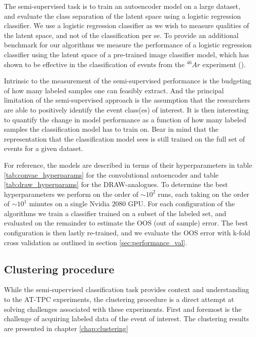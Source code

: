 The semi-supervised task is to train an autoencoder model on a large dataset, and evaluate the class separation of the latent space using a logistic regression classifier. We use a logistic regression classifier as we wish to measure qualities of the latent space, and not of the classification per se. To provide an additional benchmark for our algorithms we measure the performance of a logistic regression classifier using the latent space of a pre-trained image classifier model, which has shown to be effective in the classification of events from the ${}^{46}Ar$ experiment (\cite{Kuchera2019}).

Intrinsic to the measurement of the semi-supervised performance is the budgeting of how many labeled samples one can feasibly extract. And the principal limitation of the semi-supervised approach is the assumption that the researchers are able to positively identify the event class(es) of interest. It is then interesting to quantify the change in model performance as a function of how many labeled samples the classification model has to train on. Bear in mind that the representation that the classification model sees is still trained on the full set of events for a given dataset. 

For reference, the models are described in terms of their hyperparameters in table \ref{tab:convae_hyperparams} for the convolutional autoencoder and table \ref{tab:draw_hyperparams} for the DRAW-analogues. To determine the best hyperparameters we perform on the order of $\sim 10^2$ runs, each taking on the order of $\sim 10^1$ minutes on a single Nvidia $2080$ GPU. For each configuration of the algorithms we train a classifier trained on a subset of the labeled set, and evaluated on the remainder to estimate the OOS (out of sample) error. The best configuration is then lastly re-trained, and we evaluate the OOS error with k-fold cross validation as outlined in section \ref{sec:performance_val}.

\subsection{Clustering procedure}

While the semi-supervised classification task provides context and understanding to the AT-TPC experiments, the clustering procedure is a direct attempt at solving challenges associated with these experiments. First and foremost is the challenge of acquiring labeled data of the event of interest. The clustering results are presented in chapter \ref{chap:clustering} 

